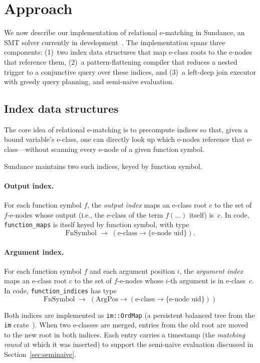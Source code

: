 \section{Approach}
\label{sec:approach}

We now describe our implementation of relational e-matching in Sundance, an SMT
solver currently in development~\cite{sundance}. The implementation spans three
components: (1)~two index data structures that map e-class roots to the e-nodes
that reference them, (2)~a pattern-flattening compiler that reduces a nested
trigger to a conjunctive query over these indices, and (3)~a left-deep join
executor with greedy query planning, and semi-naive evaluation.

\subsection{Index data structures}
\label{sec:indices}

The core idea of relational e-matching is to precompute indices so that, given a
bound variable's e-class, one can directly look up which e-nodes reference that
e-class---without scanning every e-node of a given function symbol.

Sundance maintains two such indices, keyed by function symbol.

\paragraph{Output index.} For each function symbol $f$, the \emph{output index}
maps an e-class root $c$ to the set of $f$-e-nodes whose output (i.e., the
e-class of the term $f(\ldots)$ itself) is~$c$. In code, \texttt{function\_maps}
is itself keyed by function symbol, with type
%
\[
  \text{FnSymbol} \;\to\; (\text{e-class} \to \{\text{e-node uid}\}).
\]

\paragraph{Argument index.} For each function symbol $f$ and each argument
position $i$, the \emph{argument index} maps an e-class root $c$ to the set of
$f$-e-nodes whose $i$-th argument is in e-class~$c$. In code,
\texttt{function\_indices} has type
%
\[
  \text{FnSymbol} \;\to\; (\text{ArgPos} \to (\text{e-class} \to \{\text{e-node uid}\}))
\]

Both indices are implemented as \texttt{im::OrdMap} (a persistent balanced tree
from the \texttt{im} crate~\cite{im-rs}). When two e-classes are merged, entries from the old root are moved
to the new root in both indices. Each entry carries a timestamp (the
\emph{matching round} at which it was inserted) to support the semi-naive
evaluation discussed in Section~\ref{sec:seminaive}.

